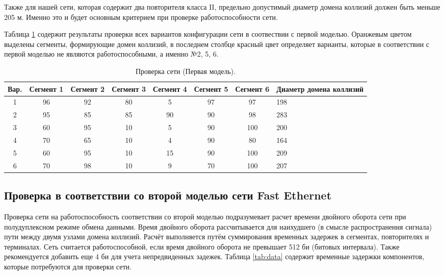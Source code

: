 Также для нашей сети, которая содержит два повторителя класса II, предельно
допустимый диаметр домена коллизий должен быть меньше 205 м. Именно это и будет
основным критерием при проверке работоспособности сети.

Таблица \ref{tab:model1} содержит результаты проверки всех вариантов конфигурации
сети в соотвествии с первой моделью. Оранжевым цветом выделены сегменты, формирующие
домен коллизий, в последнем столбце красный цвет определяет варианты, которые
в соответствии с первой моделью не являются работоспособными, а именно №2, 5, 6.

\begin{table}[!ht]
    \caption{Проверка сети (Первая модель).}
    \label{tab:model1}
    \centering
    \begin{tabular}{|c|c|c|c|c|c|c|m{2cm}|}
    \hline
    Вар. & Сегмент 1 & Сегмент 2 & Сегмент 3 & \cellcolor{lightgray} Сегмент 4 & Сегмент 5 & Сегмент 6 & Диаметр домена коллизий \\ \hline
        1 &\cellcolor{orange} 96 & 92 & 80 &\cellcolor{orange} 5 &\cellcolor{orange} 97 & 97 & 198 \\ \hline
        2 &\cellcolor{orange} 95 & 85 & 85 &\cellcolor{orange} 90 & 90 &\cellcolor{orange} 98 & \cellcolor{red} 283 \\ \hline
        3 & 60 &\cellcolor{orange} 95 & 10 &\cellcolor{orange} 5 & 90 &\cellcolor{orange} 100 & 200 \\ \hline
        4 &\cellcolor{orange} 70 & 65 & 10 &\cellcolor{orange} 4 &\cellcolor{orange} 90 & 80 & 164 \\ \hline
        5 & 60 &\cellcolor{orange} 95 & 10 &\cellcolor{orange} 15 & 90 &\cellcolor{orange} 100 &\cellcolor{red} 209 \\ \hline
        6 & 70 &\cellcolor{orange} 98 & 10 &\cellcolor{orange} 9 & 70 &\cellcolor{orange} 100 &\cellcolor{red} 207 \\ \hline
    \end{tabular}
\end{table}

\subsection{Проверка в соответствии со второй моделью сети Fast Ethernet}
Проверка сети на работоспособность соответствии со второй моделью подразумевает
расчет времени двойного оборота сети при полудуплексном режиме обмена данными.
Время двойного оборота рассчитывается для наихудшего (в смысле распространения сигнала)
пути между двумя узлами домена коллизий. Расчёт выполняется путём суммирования
временных задержек в сегментах, повторителях и терминалах.
Сеть считается работоспособной, если время двойного оборота не превышает 512 би
(битовых интервала). Также рекомендуется добавить еще 4 би для учета непредвиденных
задежек. Таблица \ref{tab:data} содержит временные задержки компонентов, которые
потребуются для проверки сети.

